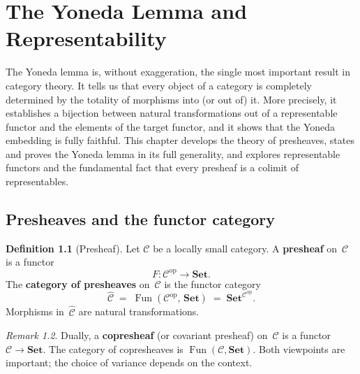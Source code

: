 \documentclass[a4paper,12pt]{book}
\DeclareMathOperator{\Fun}{Fun}
\newcommand{\Set}{\mathbf{Set}}
\newcommand{\op}{\mathrm{op}}
\theoremstyle{definition}
\newtheorem{definition}{Definition}[section]
\theoremstyle{plain}
\theoremstyle{remark}
\newtheorem{remark}[definition]{Remark}
\begin{document}
\chapter{The Yoneda Lemma and Representability}\label{ch:yoneda}
\minitoc

\vspace{1em}

The Yoneda lemma is, without exaggeration, the single most important
result in category theory.  It tells us that every object of a category
is completely determined by the totality of morphisms into (or out of) it.
More precisely, it establishes a bijection between natural
transformations out of a representable functor and the elements of the
target functor, and it shows that the Yoneda embedding is fully faithful.
This chapter develops the theory of presheaves, states and proves the
Yoneda lemma in its full generality, and explores representable functors
and the fundamental fact that every presheaf is a colimit of
representables.


\section{Presheaves and the functor category}\label{sec:presheaves}

\begin{definition}[Presheaf]\label{def:presheaf}
Let $\mathcal{C}$ be a locally small category.
A \textbf{presheaf} on~$\mathcal{C}$ is a functor
\[
    F \colon \mathcal{C}^{\op} \longrightarrow \Set.
\]
The \textbf{category of presheaves} on~$\mathcal{C}$ is the functor category
\[
    \widehat{\mathcal{C}} \;=\; \Fun(\mathcal{C}^{\op},\,\Set)
    \;=\; \Set^{\mathcal{C}^{\op}}.
\]
Morphisms in~$\widehat{\mathcal{C}}$ are natural transformations.
\end{definition}

\begin{remark}\label{rem:presheaf-covariant}
Dually, a \textbf{copresheaf} (or covariant presheaf) on~$\mathcal{C}$
is a functor $\mathcal{C}\to\Set$.  The category of copresheaves is
$\Fun(\mathcal{C},\Set)$.  Both viewpoints are important; the choice of
variance depends on the context.
\end{remark}
\end{document}
